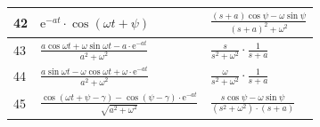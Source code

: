 \begin{table}[h!]
\begin{minipage}{0.5\columnwidth}
\begin{tabularx}{\columnwidth}{|l|l|X|}
		\hline 42 & $\mathrm{e}^{-a t} \cdot \cos (\omega t+\psi)$ & 
		$\frac{(s+a) \cos \psi-\omega \sin \psi}{(s+a)^2+\omega^2}$ \\
		\hline 43 & 
		$\frac{a \cos \omega t+\omega \sin \omega t-a \cdot \mathrm{e}^{-a t}}{a^2+\omega^2}$ &
		$\frac{s}{s^2+\omega^2} \cdot \frac{1}{s+a}$\\
		\hline 44 & 
		$\frac{a \sin \omega t-\omega \cos \omega t+\omega \cdot \mathrm{e}^{-a t}}{a^2+\omega^2}$ & 
		$\frac{\omega}{s^2+\omega^2} \cdot \frac{1}{s+a}$ \\
		\hline 45 & 
		$\frac{\cos (\omega t+\psi-\gamma)-\cos (\psi-\gamma) \cdot \mathrm{e}^{-a t}}{\sqrt{a^2+\omega^2}}$ & 
		$\frac{s \cos \psi-\omega \sin \psi}{\left(s^2+\omega^2\right) \cdot(s+a)}$ \\
		\hline
	\end{tabularx}
\end{minipage}
\end{table}
\noindent
